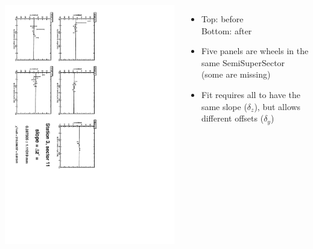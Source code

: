 \documentclass[compress]{beamer}
\begin{document}
\begin{frame}
\begin{columns}
\vfill
\includegraphics[height=\linewidth, angle=90]{zfits_after/zfit_3_11.pdf}
\begin{itemize}
\item Top: before \\ Bottom: after
\item Five panels are wheels in the same SemiSuperSector (some are missing)
\item Fit requires all to have the same slope ($\delta_z$), but allows different offsets ($\delta_y$)
\end{itemize}
\end{columns}
\end{frame}
\end{document}
